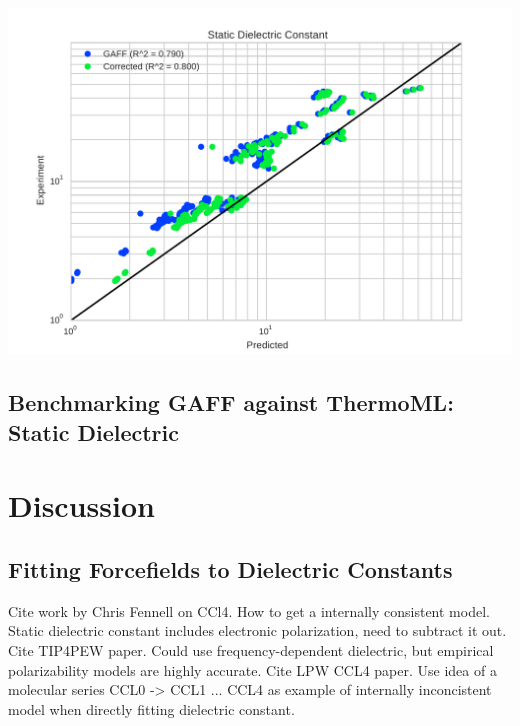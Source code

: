 \documentclass[aps,pre,twocolumn,superscriptaddress]{revtex4-1}
\begin{document}
\includegraphics[width=\columnwidth]{./figures/dielectrics_thermoml.pdf}

\subsection{Benchmarking GAFF against ThermoML: Static Dielectric}


\section{Discussion}

\subsection{Fitting Forcefields to Dielectric Constants}

Cite work by Chris Fennell on CCl4.  How to get a internally consistent model.  Static dielectric constant includes electronic polarization, need to subtract it out.  Cite TIP4PEW paper.  Could use frequency-dependent dielectric, but empirical polarizability models are highly accurate.  Cite LPW CCL4 paper.  Use idea of a molecular series CCL0 -> CCL1 ... CCL4 as example of internally inconcistent model when directly fitting dielectric constant.
\end{document}
